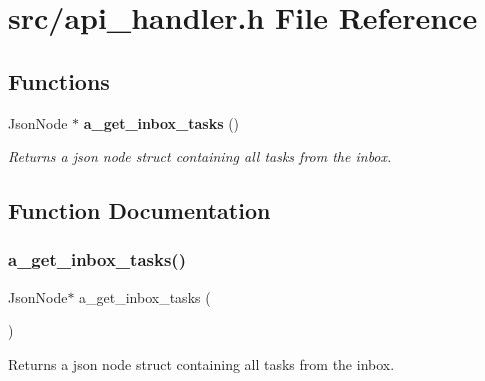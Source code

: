 \section{src/api\+\_\+handler.h File Reference}
\label{api__handler_8h}
\subsection*{Functions}
\begin{DoxyCompactItemize}
\item 
Json\+Node $\ast$ \textbf{ a\+\_\+get\+\_\+inbox\+\_\+tasks} ()
\begin{DoxyCompactList}\small\item\em Returns a json node struct containing all tasks from the inbox. \end{DoxyCompactList}\end{DoxyCompactItemize}


\subsection{Function Documentation}
\mbox{\label{api__handler_8h_aad3b42b9a6dfd0a86a95eca2363dab11}} 
\subsubsection{a\+\_\+get\+\_\+inbox\+\_\+tasks()}
{\footnotesize\ttfamily Json\+Node$\ast$ a\+\_\+get\+\_\+inbox\+\_\+tasks (\begin{DoxyParamCaption}{ }\end{DoxyParamCaption})}



Returns a json node struct containing all tasks from the inbox. 

